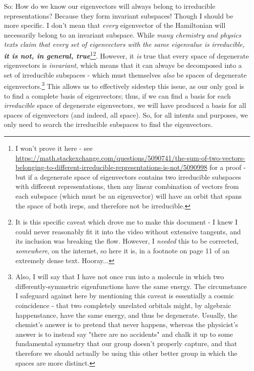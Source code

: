 \documentclass{article}
\begin{document}
So: How do we know our eigenvectors will always belong to irreducible representations? Because they form invariant subspaces! Though I should be more specific. I don't mean that \textit{every} eigenvector of the Hamiltonian will necessarily belong to an invariant subspace. While \textit{many chemistry and physics texts claim that every set of eigenvectors with the same eigenvalue is irreducible, \textbf{it is not, in general, true}}\footnote{I won't prove it here - see \url{https://math.stackexchange.com/questions/5090741/the-sum-of-two-vectors-belonging-to-different-irreducible-representations-is-not/5090998} for a proof - but if a degenerate space of eigenvectors contains two irreducible subspaces with different representations, then any linear combination of vectors from each subspace (which must be an eigenvector) will have an orbit that spans the space of both ireps, and therefore not be irreducible.}\footnote{It is this specific caveat which drove me to make this document - I knew I could never reasonably fit it into the video without extensive tangents, and its inclusion was breaking the flow. However, I \textit{needed} this to be corrected, \textit{somewhere}, on the internet, so here it is, in a footnote on page 11 of an extremely dense text. Hooray...}. However, it \textit{is} true that every space of degenerate eigenvectors is \textit{invariant}, which means that it can always be decomposed into a set of irreducible subspaces - which must themselves \textit{also} be spaces of degenerate eigenvectors.\footnote{Also, I will say that I have not once run into a molecule in which two differently-symmetric eigenfunctions have the same energy. The circumstance I safeguard against here by mentioning this caveat is essentially a cosmic coincidence - that two completely unrelated orbitals might, by algebraic happenstance, have the same energy, and thus be degenerate. Usually, the chemist's answer is to pretend that never happens, whereas the physicist's answer is to instead say "there are no accidents" and chalk it up to some fundamental symmetry that our group doesn't properly capture, and that therefore we should actually be using this other better group in which the spaces are more distinct.} This allows us to effectively sidestep this issue, as our only goal is to find a complete basis of eigenvectors; thus, if we can find a basis for each \textit{irreducible} space of degenerate eigenvectors, we will have produced a basis for all spaces of eigenvectors (and indeed, all space). So, for all intents and purposes, we only need to search the irreducible subspaces to find the eigenvectors.
\end{document}
